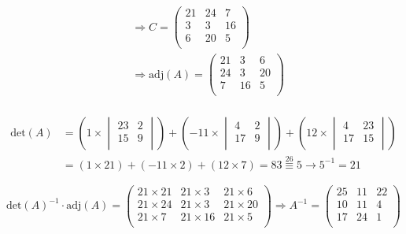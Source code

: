 \documentclass{article}
\newcommand{\modts}{\overset{26}{\equiv}}
\begin{document}
\begin{equation*}
\begin{split}
& \Rightarrow C = 
\begin{pmatrix}
21 & 24 & 7 \\
3 & 3 & 16 \\
6 & 20 & 5 \\
\end{pmatrix} \\
& \Rightarrow \mathrm{adj}(A) = 
\begin{pmatrix}
21 & 3 & 6 \\
24 & 3 & 20 \\
7 & 16 & 5 \\
\end{pmatrix} \\
\end{split}
\end{equation*}

\begin{equation*}
\begin{split}
\mathrm{det}(A) & = 
(1 \times 
\begin{vmatrix}
23 & 2 \\
15 & 9 \\
\end{vmatrix}
) + (
-11 \times 
\begin{vmatrix}
4 & 2 \\
17 & 9 \\
\end{vmatrix}
) + (
12 \times 
\begin{vmatrix}
4 & 23 \\
17 & 15 \\
\end{vmatrix}
) \\
& = (1 \times 21) + (-11 \times 2) + (12 \times 7) = 83 \modts 5 \rightarrow 5^{-1} = 21
\end{split}
\end{equation*}

\begin{equation*}
\mathrm{det}(A)^{-1} \cdot \mathrm{adj}(A) =
\begin{pmatrix}
21\times21 & 21\times3 & 21\times6 \\
21\times24 & 21\times3 & 21\times20 \\
21\times7 & 21\times16 & 21\times5 \\
\end{pmatrix} \Rightarrow 
A^{-1} = 
\begin{pmatrix}
25 & 11 & 22 \\
10 & 11 & 4 \\
17 & 24 & 1 \\
\end{pmatrix}
\end{equation*}
\end{document}
